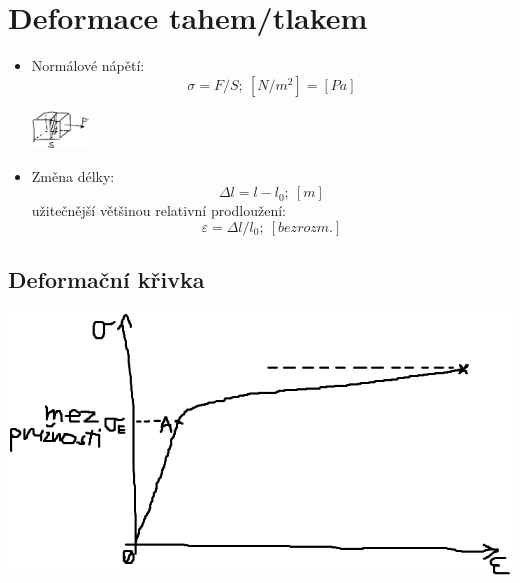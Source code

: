 \documentclass{article}
\begin{document}
  \section{Deformace tahem/tlakem}

    \begin{itemize}
      \item Normálové nápětí:
      	\begin{equation*}
          \sigma=F/S; \ [N/m^2] = [Pa]
        \end{equation*}
        \begin{center}
          \vspace{-0.25cm}\includegraphics[width=0.12\textwidth]{normalove_napeti}\vspace{-0.25cm}
        \end{center}
      \item Změna délky:
        \begin{equation*}
          \Delta l = l - l_0; \ [m]
        \end{equation*}
      užitečnější většinou relativní prodloužení:
        \begin{equation*}
          \varepsilon = \Delta l/l_0; \ [bezrozm.]
        \end{equation*}
    \end{itemize}

    \subsection{Deformační křivka}
      \begin{center}
        \vspace{-0.1cm}\includegraphics[width=0.75\linewidth]{deformacni_krivka}\vspace{-0.25cm}
      \end{center}
\end{document}
